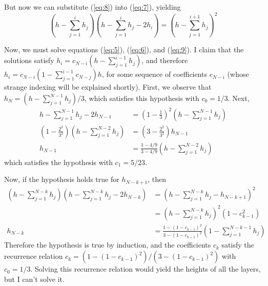 \documentclass[12pt]{article}
\begin{document}
But now we can substitute (\ref{eq:8}) into (\ref{eq:7}), yielding
\begin{equation}
  \label{eq:9}
  \left( h - \sum_{j=1}^i h_j \right) \left( h - \sum_{j=1}^i h_j - 2h_i \right) = \left( h - \sum_{j=1}^{i+1}h_j \right)^2
\end{equation}

Now, we must solve equations (\ref{eq:5}), (\ref{eq:6}), and (\ref{eq:9}). I claim that the solutions satisfy $h_i = c_{N-i}(h - \sum_{j=1}^{i-1}h_j)$, and therefore $h_i = c_{N-i}(1 - \sum_{j=1}^{i-1}c_{N-j})h$, for some sequence of coefficients $c_{N-i}$ (whose strange indexing will be explained shortly). First, we observe that $h_N = (h - \sum_{j=1}^{N-1}h_j)/3$, which satisfies this hypothesis with $c_0 = 1/3$. Next,
\begin{align*}
  h - \sum_{j=1}^{N-1}h_j - 2h_{N-1} &= \left( 1 - \frac{1}{3} \right)^2 \left( h - \sum_{j=1}^{N-1}h_j \right) \\
  \left( 1 - \frac{2^2}{3^2} \right)\left( h - \sum_{j=1}^{N-2}h_j \right) &= \left( 3 - \frac{2^2}{3^2} \right)h_{N-1}\\
  h_{N-1} &= \frac{1 - 4/9}{3-4/9} \left( h - \sum_{j=1}^{N-2}h_j \right)
\end{align*}
which satisfies the hypothesis with $c_1 = 5/23$.

Now, if the hypothesis holds true for $h_{N-k+1}$, then
\begin{align*}
  \left( h - \sum_{j=1}^{N-k}h_j \right) \left( h - \sum_{j=1}^{N-k}h_j - 2h_{N-k} \right) &= \left( h - \sum_{j=1}^{N-k}h_j - h_{N-k+1} \right)^2 \\
                                                                                           &= \left( h - \sum_{j=1}^{N-k}h_j \right)^2 \left( 1 - c_{k-1}^2 \right)\\
  h_{N-k} &= \frac{1 - (1-c_{k-1})^2}{3-(1-c_{k-1})^2}\left( 1 - \sum_{j=1}^{N-k-1}h_j \right)
\end{align*}
Therefore the hypothesis is true by induction, and the coefficients $c_k$ satisfy the recurrence relation $c_k = (1-(1-c_{k-1})^2)/(3-(1-c_{k-1})^2)$ with $c_0 = 1/3$. Solving this recurrence relation would yield the heights of all the layers, but I can't solve it.
\end{document}
